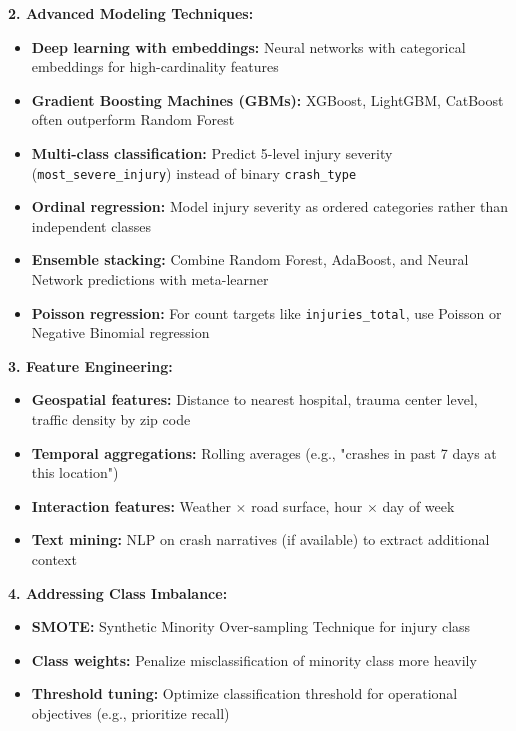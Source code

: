 \documentclass[12pt,man]{apa7}
\begin{document}
\textbf{2. Advanced Modeling Techniques:}
\begin{itemize}
    \item \textbf{Deep learning with embeddings:} Neural networks with categorical embeddings for high-cardinality features
    \item \textbf{Gradient Boosting Machines (GBMs):} XGBoost, LightGBM, CatBoost often outperform Random Forest
    \item \textbf{Multi-class classification:} Predict 5-level injury severity (\texttt{most\_severe\_injury}) instead of binary \texttt{crash\_type}
    \item \textbf{Ordinal regression:} Model injury severity as ordered categories rather than independent classes
    \item \textbf{Ensemble stacking:} Combine Random Forest, AdaBoost, and Neural Network predictions with meta-learner
    \item \textbf{Poisson regression:} For count targets like \texttt{injuries\_total}, use Poisson or Negative Binomial regression
\end{itemize}

\textbf{3. Feature Engineering:}
\begin{itemize}
    \item \textbf{Geospatial features:} Distance to nearest hospital, trauma center level, traffic density by zip code
    \item \textbf{Temporal aggregations:} Rolling averages (e.g., "crashes in past 7 days at this location")
    \item \textbf{Interaction features:} Weather $\times$ road surface, hour $\times$ day of week
    \item \textbf{Text mining:} NLP on crash narratives (if available) to extract additional context
\end{itemize}

\textbf{4. Addressing Class Imbalance:}
\begin{itemize}
    \item \textbf{SMOTE:} Synthetic Minority Over-sampling Technique for injury class
    \item \textbf{Class weights:} Penalize misclassification of minority class more heavily
    \item \textbf{Threshold tuning:} Optimize classification threshold for operational objectives (e.g., prioritize recall)
\end{itemize}
\end{document}
